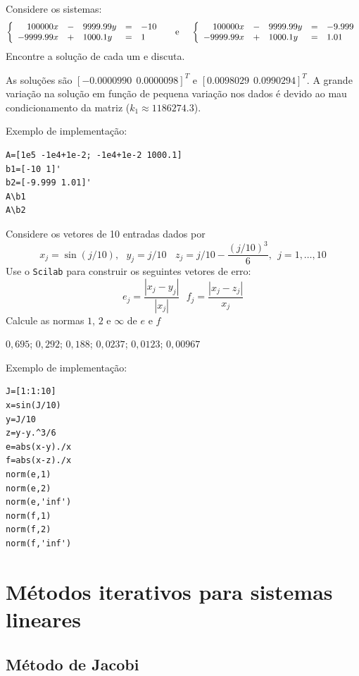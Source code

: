 \begin{Exercise} Considere os sistemas:
$$
\left\{
\begin{array}{rclcl}
100000 x  &-& 9999.99 y  &=&-10\\
-9999.99 x &+&  1000.1 y &=&1
\end{array}\right. ~~~~\hbox{e}~~~~
\left\{
\begin{array}{rclcl}
100000 x  &-& 9999.99 y  &=&-9.999\\
-9999.99 x &+&  1000.1 y &=&1.01
\end{array}\right.
$$
Encontre a solução de cada um e discuta.
\end{Exercise}
\begin{Answer}
As soluções são $[-0.0000990 ~~ 0.0000098]^T$ e $[0.0098029 ~~ 0.0990294]^T$. A grande variação na solução em função de pequena variação nos dados é devido ao mau condicionamento da matriz ($k_1\approx 1186274.3 $).

Exemplo de implementação:
\begin{verbatim}
A=[1e5 -1e4+1e-2; -1e4+1e-2 1000.1]
b1=[-10 1]'
b2=[-9.999 1.01]'
A\b1
A\b2
\end{verbatim}
\end{Answer}

\begin{Exercise} Considere os vetores de 10 entradas dados por $$x_j=\sin(j/10),~~~y_j=j/10~~~~z_j=j/10-\frac{\left(j/10\right)^3}{6},~~ j=1,\ldots,10$$
Use o \verb+Scilab+ para construir os seguintes vetores de erro:
$$e_{j}=\frac{|x_j-y_j|}{|x_j|}~~~ f_j=\frac{|x_j-z_j|}{x_j}$$
Calcule as normas $1$, $2$ e $\infty$ de $e$ e $f$
\end{Exercise}
\begin{Answer}
$0,695$; $0,292$; $0,188$;  $0,0237$; $0,0123$; $0,00967$

\ifisscilab
Exemplo de implementação:
\begin{verbatim}
J=[1:1:10]
x=sin(J/10)
y=J/10
z=y-y.^3/6
e=abs(x-y)./x
f=abs(x-z)./x
norm(e,1)
norm(e,2)
norm(e,'inf')
norm(f,1)
norm(f,2)
norm(f,'inf')
\end{verbatim}
\fi
\end{Answer}



\section{Métodos iterativos para sistemas lineares}

\subsection{Método de Jacobi}

